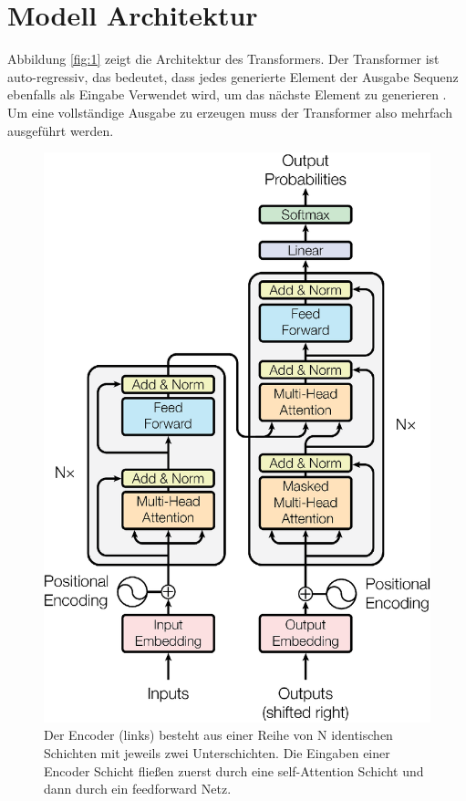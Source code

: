 \documentclass[conference]{IEEEtran}
\begin{document}
\section{Modell Architektur}
Abbildung \ref{fig:1} zeigt die Architektur des Transformers. Der Transformer ist auto-regressiv, das bedeutet, dass jedes generierte Element der Ausgabe Sequenz ebenfalls als Eingabe Verwendet wird, um das nächste Element zu generieren \cite{attention_is_all_you_need}. Um eine vollständige Ausgabe zu erzeugen muss der Transformer also mehrfach ausgeführt werden.
\begin{figure}[htbp]
\centerline{\includegraphics{img/figure1.png}}
\caption{Der Encoder (links) besteht aus einer Reihe von N identischen Schichten mit jeweils zwei Unterschichten. Die Eingaben einer Encoder Schicht fließen zuerst durch eine self-Attention Schicht und dann durch ein feedforward Netz. \\
}
\end{figure}
\end{document}
